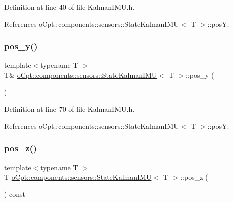 Definition at line 40 of file Kalman\+I\+M\+U.\+h.



References o\+Cpt\+::components\+::sensors\+::\+State\+Kalman\+I\+M\+U$<$ T $>$\+::posY.

\hypertarget{classo_cpt_1_1components_1_1sensors_1_1_state_kalman_i_m_u_a24b3a38a7f3b409ed9dfeb9819ec5752}{}\label{classo_cpt_1_1components_1_1sensors_1_1_state_kalman_i_m_u_a24b3a38a7f3b409ed9dfeb9819ec5752} 
\subsubsection{\texorpdfstring{pos\+\_\+y()}{pos\_y()}\hspace{0.1cm}{\footnotesize\ttfamily [2/2]}}
{\footnotesize\ttfamily template$<$typename T $>$ \\
T\& \hyperlink{classo_cpt_1_1components_1_1sensors_1_1_state_kalman_i_m_u}{o\+Cpt\+::components\+::sensors\+::\+State\+Kalman\+I\+MU}$<$ T $>$\+::pos\+\_\+y (\begin{DoxyParamCaption}{ }\end{DoxyParamCaption})\hspace{0.3cm}{\ttfamily [inline]}}



Definition at line 70 of file Kalman\+I\+M\+U.\+h.



References o\+Cpt\+::components\+::sensors\+::\+State\+Kalman\+I\+M\+U$<$ T $>$\+::posY.

\hypertarget{classo_cpt_1_1components_1_1sensors_1_1_state_kalman_i_m_u_aad071acb42796e2e8a1c2361c326a50d}{}\label{classo_cpt_1_1components_1_1sensors_1_1_state_kalman_i_m_u_aad071acb42796e2e8a1c2361c326a50d} 
\subsubsection{\texorpdfstring{pos\+\_\+z()}{pos\_z()}\hspace{0.1cm}{\footnotesize\ttfamily [1/2]}}
{\footnotesize\ttfamily template$<$typename T $>$ \\
T \hyperlink{classo_cpt_1_1components_1_1sensors_1_1_state_kalman_i_m_u}{o\+Cpt\+::components\+::sensors\+::\+State\+Kalman\+I\+MU}$<$ T $>$\+::pos\+\_\+z (\begin{DoxyParamCaption}{ }\end{DoxyParamCaption}) const\hspace{0.3cm}{\ttfamily [inline]}}




